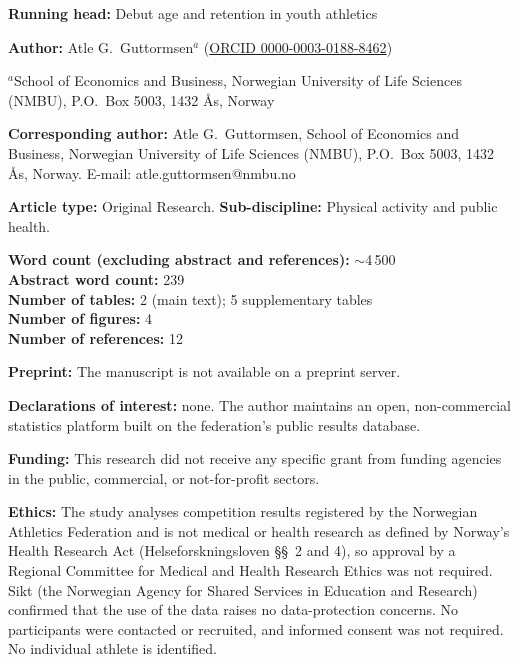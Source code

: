 \documentclass[12pt,a4paper]{article}
\begin{document}

\bigskip
{}

\bigskip
\noindent\textbf{Running head:} Debut age and retention in youth athletics

\bigskip
\noindent\textbf{Author:} Atle G.\ Guttormsen$^{a}$ (\href{https://orcid.org/0000-0003-0188-8462}{ORCID 0000-0003-0188-8462})

\medskip
\noindent $^{a}$School of Economics and Business, Norwegian University of Life Sciences (NMBU), P.O.\ Box 5003, 1432 Ås, Norway

\medskip
\noindent\textbf{Corresponding author:} Atle G.\ Guttormsen, School of Economics and Business, Norwegian University of Life Sciences (NMBU), P.O.\ Box 5003, 1432 Ås, Norway. E-mail: atle.guttormsen@nmbu.no

\bigskip
\noindent\textbf{Article type:} Original Research. \textbf{Sub-discipline:} Physical activity and public health.

\medskip
\noindent\textbf{Word count (excluding abstract and references):} $\sim$4\,500 \\
\textbf{Abstract word count:} 239 \\
\textbf{Number of tables:} 2 (main text); 5 supplementary tables \\
\textbf{Number of figures:} 4 \\
\textbf{Number of references:} 12

\medskip
\noindent\textbf{Preprint:} The manuscript is not available on a preprint server.

\medskip
\noindent\textbf{Declarations of interest:} none. The author maintains an open, non-commercial statistics platform built on the federation's public results database.

\medskip
\noindent\textbf{Funding:} This research did not receive any specific grant from funding agencies in the public, commercial, or not-for-profit sectors.

\medskip
\noindent\textbf{Ethics:} The study analyses competition results registered by the Norwegian Athletics Federation and is not medical or health research as defined by Norway's Health Research Act (Helseforskningsloven \S\S~2 and 4), so approval by a Regional Committee for Medical and Health Research Ethics was not required. Sikt (the Norwegian Agency for Shared Services in Education and Research) confirmed that the use of the data raises no data-protection concerns. No participants were contacted or recruited, and informed consent was not required. No individual athlete is identified.
\end{document}
